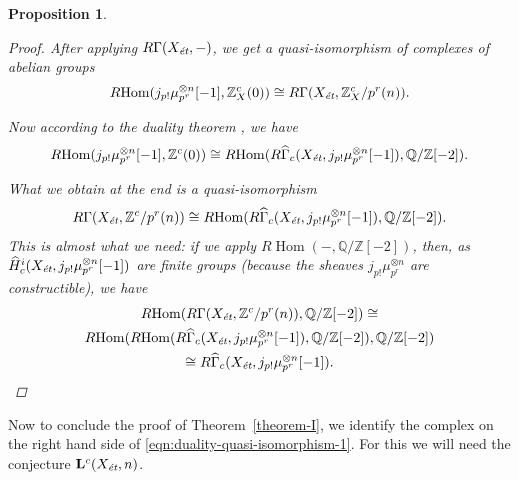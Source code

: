 \documentclass[leqno,12pt]{article}
\theoremstyle{plain}
\newtheorem{proposition}[theorem]{\indent\sc Proposition}
\theoremstyle{definition}
\DeclareMathOperator{\Hom}{Hom}
\newcommand{\ZZ}{\mathbb{Z}}
\newcommand{\QQ}{\mathbb{Q}}
\newcommand{\et}{\text{\it \'{e}t}}
\newcommand{\RHom}{R\!\Hom}
\begin{document}
\begin{proposition}
\begin{proof}
    After applying $R\Gamma (X_\et, -)$, we get a quasi-isomorphism of
    complexes of abelian groups
    \begin{equation}
      \RHom (j_{p!} \mu_{p^r}^{\otimes n} [-1], \ZZ^c_X (0)) \cong
      R\Gamma (X_\et, \ZZ^c_X/p^r (n)).
    \end{equation}

    Now according to the duality theorem \cite[Theorem 7.8]{Geisser-2010},
    we have
    \begin{equation}
      \RHom (j_{p !} \mu_{p^r}^{\otimes n} [-1], \ZZ^c (0)) \cong
      \RHom (R\widehat{\Gamma}_c (X_\et, j_{p !} \mu_{p^r}^{\otimes n} [-1]), \QQ/\ZZ [-2]).
    \end{equation}

    What we obtain at the end is a quasi-isomorphism
    \[ R\Gamma (X_\et, \ZZ^c/p^r (n)) \cong
    \RHom (R\widehat{\Gamma}_c (X_\et, j_{p !} \mu_{p^r}^{\otimes n} [-1]), \QQ/\ZZ [-2]). \]
    This is almost what we need: if we apply $\RHom (-,\QQ/\ZZ [-2])$, then, as
    $\widehat{H}^i_c (X_\et, j_{p!} \mu_{p^r}^{\otimes n} [-1])$ are
    finite groups (because the sheaves $j_{p!} \mu_{p^r}^{\otimes n}$ are
    constructible), we have
    \begin{multline*}
      \RHom (R\Gamma (X_\et, \ZZ^c/p^r (n)), \QQ/\ZZ[-2]) \cong\\
      \RHom (\RHom (R\widehat{\Gamma}_c (X_\et, j_{p !} \mu_{p^r}^{\otimes n} [-1]), \QQ/\ZZ[-2]), \QQ/\ZZ[-2]) \\
      \cong R\widehat{\Gamma}_c (X_\et, j_{p !} \mu_{p^r}^{\otimes n} [-1]). \qedhere
    \end{multline*}
  \end{proof}
\end{proposition}

Now to conclude the proof of Theorem~\ref{theorem-I}, we identify the complex
on the right hand side of \eqref{eqn:duality-quasi-isomorphism-1}. For this we
will need the conjecture $\mathbf{L}^c (X_\et, n)$.
\end{document}
